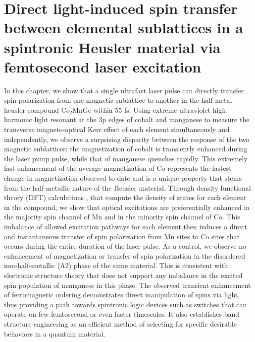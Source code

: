 \chapter{Direct light-induced spin transfer between elemental sublattices in a spintronic Heusler material via femtosecond laser excitation}
\label{heuslerpaper}

In this chapter, we show that a single ultrafast laser pulse can directly transfer spin polarization from one magnetic sublattice to another in the half-metal heusler compound C$o_2$MnGe within 55 fs. Using extreme ultraviolet high harmonic light resonant at the 3p edges of cobalt and manganese to measure the transverse magneto-optical Kerr effect of each element simultaneously and independently, we observe a surprising disparity between the response of the two magnetic sublattices: the magnetization of cobalt is transiently enhanced during the laser pump pulse, while that of manganese quenches rapidly. This extremely fast enhancement of the average magnetization of Co represents the fastest change in magnetization observed to date and is a unique property that stems from the half-metallic nature of the Heusler material. Through density functional theory (DFT) calculations \cite{Hohenberg1964,KOHN1965}, that compute the density of states for each element in the compound, we show that optical excitations are preferentially enhanced in the majority spin channel of Mn and in the minority spin channel of Co. This imbalance of allowed excitation pathways for each element then induces a direct and instantaneous transfer of spin polarization from Mn sites to Co sites that occurs during the entire duration of the laser pulse. As a control, we observe no enhancement of magnetization or transfer of spin polarization in the disordered non-half-metallic (A2) phase of the same material. This is consistent with electronic structure theory that does not support any imbalance in the excited spin population of manganese in this phase. The observed transient enhancement of ferromagnetic ordering demonstrates direct manipulation of spins via light, thus providing a path towards spintronic logic devices such as switches that can operate on few femtosecond or even faster timescales. It also establishes band structure engineering as an efficient method of selecting for specific desirable behaviors in a quantum material.


